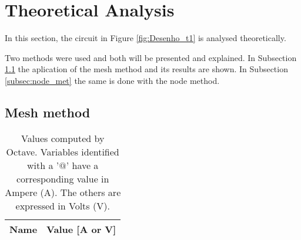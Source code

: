 
\section{Theoretical Analysis}
\label{sec:analysis}



In this section, the circuit in Figure \ref{fig:Desenho_t1} is analysed theoretically.

Two methods were used and both will be presented and explained. In Subsection \ref{subsec:mesh_met}
the aplication of the mesh method and its results are shown. In Subsection \ref{subsec:node_met} the
same is done with the  node method.




\subsection{Mesh method}
\label{subsec:mesh_met}





\begin{table}[h]
	\centering
	\begin{tabular}{|l|r|}
    		\hline    
    		{\bf Name} & {\bf Value [A or V]} \\ \hline
    		
  	\end{tabular}
  	\caption{Values computed by Octave. Variables identified with a '$@$' have a
  	corresponding value in Ampere (A). The others are expressed in Volts (V).}
 
\label{tab:oct}
\end{table}


